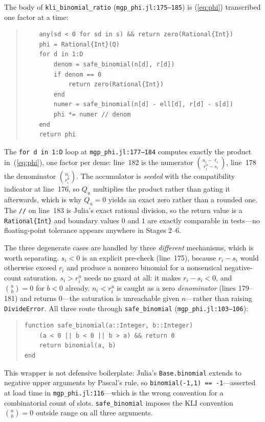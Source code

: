 \documentclass[11pt,leqno]{article}
\newcommand{\code}[1]{\texttt{#1}}
\theoremstyle{plain}
\theoremstyle{definition}
\begin{document}
The body of \code{kli\_binomial\_ratio} (\code{mgp\_phi.jl:175--185}) is
(\ref{eq:phi}) transcribed one factor at a time:
\begin{quote}
{\small
\begin{verbatim}
    any(sd < 0 for sd in s) && return zero(Rational{Int})
    phi = Rational{Int}(Q)
    for d in 1:D
        denom = safe_binomial(n[d], r[d])
        if denom == 0
            return zero(Rational{Int})
        end
        numer = safe_binomial(n[d] - ell[d], r[d] - s[d])
        phi *= numer // denom
    end
    return phi
\end{verbatim}
}
\end{quote}
The \code{for d in 1:D} loop at \code{mgp\_phi.jl:177--184} computes exactly
the product in~(\ref{eq:phi}), one factor per deme: line~182 is the numerator
$\binom{n_i-\ell_i}{r^u_i-s_i}$, line~178 the denominator
$\binom{n_i}{r^u_i}$.  The accumulator is \emph{seeded} with the
compatibility indicator at line~176, so $Q_u$ multiplies the product rather
than gating it afterwards, which is why $Q_u = 0$ yields an exact zero rather
than a rounded one.  The \code{//} on line~183 is Julia's exact rational
division, so the return value is a \code{Rational\{Int\}} and boundary values
$0$ and $1$ are exactly comparable in tests---no floating-point tolerance
appears anywhere in Stages 2--6.

The three degenerate cases are handled by three \emph{different} mechanisms,
which is worth separating.  $s_i < 0$ is an explicit pre-check (line~175),
because $r_i - s_i$ would otherwise exceed $r_i$ and produce a nonzero
binomial for a nonsensical negative-count saturation.  $s_i > r^u_i$ needs no
guard at all: it makes $r_i - s_i < 0$, and $\binom{a}{b} = 0$ for $b<0$
already.  $n_i < r^u_i$ is caught as a zero \emph{denominator} (lines
179--181) and returns $0$---the saturation is unreachable given $n$---rather
than raising \code{DivideError}.  All three route through
\code{safe\_binomial} (\code{mgp\_phi.jl:103--106}):
\begin{quote}
{\small
\begin{verbatim}
function safe_binomial(a::Integer, b::Integer)
    (a < 0 || b < 0 || b > a) && return 0
    return binomial(a, b)
end
\end{verbatim}
}
\end{quote}
This wrapper is not defensive boilerplate: Julia's \code{Base.binomial}
extends to negative upper arguments by Pascal's rule, so
\code{binomial(-1,1) == -1}---asserted at load time in
\code{mgp\_phi.jl:116}---which is the wrong convention for a combinatorial
count of slots.  \code{safe\_binomial} imposes the KLI convention
$\binom{a}{b}=0$ outside range on all three arguments.
\end{document}
